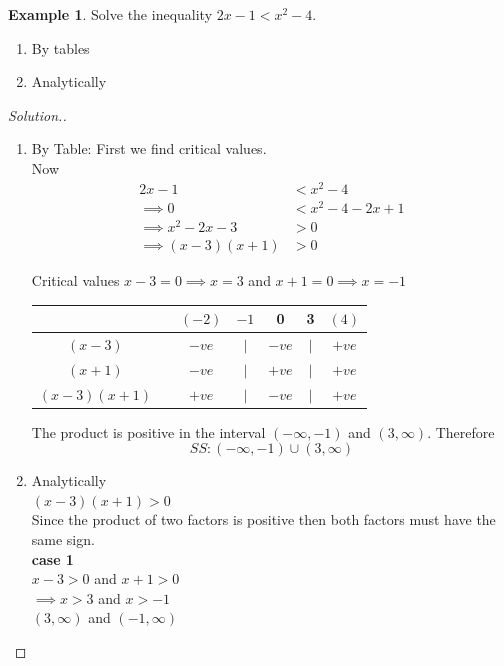 \documentclass[11pt,a4paper]{article}
\theoremstyle{definition}
\newtheorem{example}[thm]{Example}
\newenvironment{solution}
  {\renewcommand{\qedsymbol}{}\begin{proof}[\textit{Solution}.]}
  {\end{proof}}
\begin{document}
\begin{example}

Solve the inequality $2x-1<x^2-4$.
\begin{enumerate}
\item By tables
\item Analytically\\
\end{enumerate}
\end{example}
\begin{solution}

\begin{enumerate}
\item By Table: First we find critical values.\\

Now
\begin{align*}
2x-1 & < x^2-4\\
\implies 0 &< x^2-4-2x+1\\
\implies x^2-2x-3 &>0\\
\implies (x-3)(x+1)&>0
\end{align*}

Critical values $x-3=0\implies x=3$ and $x+1=0\implies x=-1$\\


\begin{table}[H]
\centering
\begin{tabular}{ccccccc}
&& $(-2)$ & $-1$ & 0 & 3 & $(4)$\\
\hline 
$(x-3)$ & \multicolumn{1}{r|}{} & $-ve$ & $|$ & $-ve$ & $|$ & $+ve$\\
$(x+1)$ & \multicolumn{1}{r|}{} & $-ve$ & $|$ & $+ve$ & $|$ & $+ve$\\
$(x-3)(x+1)$ & \multicolumn{1}{r|}{} & $+ve$ & $|$ & $-ve$ & $|$ & $+ve$\\
\end{tabular}
\end{table}

The product is positive in the interval $(-\infty,-1)$ and $(3,\infty)$. Therefore $$SS:(-\infty,-1)\cup (3,\infty)$$

\item Analytically\\
$(x-3)(x+1)>0$\\
Since the product of two factors is positive then both factors must have the same sign.\\

\textbf{case 1}\\
$x-3>0$ and $x+1>0$\\
$\implies x>3$ and $x>-1$\\
$(3,\infty)$ and $(-1,\infty)$\\


\end{enumerate}
\end{solution}
\end{document}
